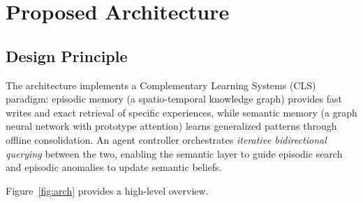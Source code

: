 \documentclass{article}
\begin{document}
\section{Proposed Architecture}
\label{sec:method}

\subsection{Design Principle}

The architecture implements a Complementary Learning Systems (CLS) paradigm:
episodic memory (a spatio-temporal knowledge graph) provides fast writes and exact
retrieval of specific experiences, while semantic memory (a graph neural network
with prototype attention) learns generalized patterns through offline
consolidation. An agent controller orchestrates \emph{iterative bidirectional
querying} between the two, enabling the semantic layer to guide episodic search and
episodic anomalies to update semantic beliefs.

Figure~\ref{fig:arch} provides a high-level overview.
\end{document}
